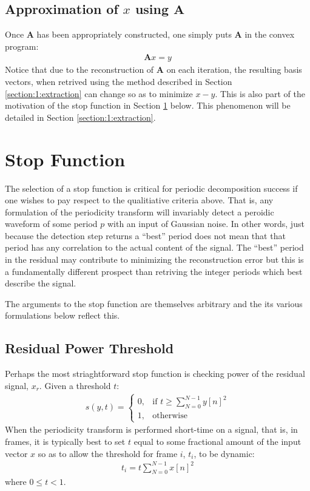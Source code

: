     \subsection{Approximation of $x$ using $\bm{A}$}
    Once $\bm{A}$ has been appropriately constructed, one simply puts $\bm{A}$ in the convex program:
    \begin{align*}
        \bm{A}x = y
    \end{align*}
    Notice that due to the reconstruction of $\bm{A}$ on each iteration, the resulting basis vectors, when retrived using the method described in Section \ref{section:1:extraction} can change so as to minimize $x - y$. This is also part of the motivation of the stop function in Section \ref{section:1:stopFunction} below. This phenomenon will be detailed in Section \ref{section:1:extraction}.

\section{Stop Function}\label{section:1:stopFunction}
The selection of a stop function is critical for periodic decomposition success if one wishes to pay respect to the qualitiative criteria above. That is, any formulation of the periodicity transform will invariably detect a peroidic waveform of some period $p$ with an input of Gaussian noise. In other words, just because the detection step returns a ``best'' period does not mean that that period has any correlation to the actual content of the signal. The ``best'' period in the residual may contribute to minimizing the reconstruction error but this is a fundamentally different prospect than retriving the integer periods which best describe the signal.

The arguments to the stop function are themselves arbitrary and the its various formulations below reflect this.

    \subsection{Residual Power Threshold}
    Perhaps the most striaghtforward stop function is checking power of the residual signal, $x_r$. Given a threshold $t$:
    \begin{align}\label{eq:s:powerThreshold}
        s(y, t) =
            \begin{cases}
                0, & \text{if } t \geq \sum_{N = 0}^{N-1} y[n]^2 \\
                1, & \text{otherwise}
            \end{cases}
    \end{align}
    When the periodicity transform is performed short-time on a signal, that is, in frames, it is typically best to set $t$ equal to some fractional amount of the input vector $x$ so as to allow the threshold for frame $i$, $t_i$, to be dynamic:
    \begin{align*}
        t_i = t \sum_{N = 0}^{N-1} x[n]^2
    \end{align*}
    where $0 \leq t < 1$.

